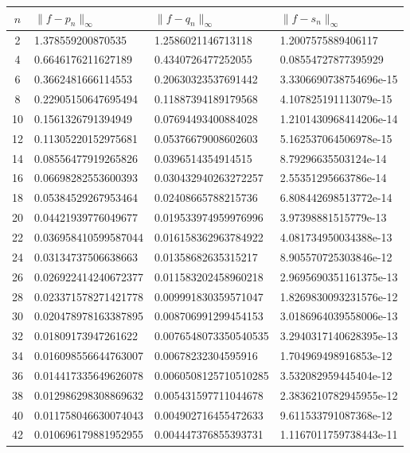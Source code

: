 \documentclass[11pt]{article}
\newenvironment{problem}[2][Question]{\begin{trivlist}
\item[\hskip \labelsep {\bfseries #1}\hskip \labelsep {\bfseries #2.}]}{\end{trivlist}}
\theoremstyle{definition}
\begin{document}
\begin{problem}{Q2}
\begin{enumerate}[(a)]
\newpage
\begin{tabular}{| c | l | l | l | }
\hline
$n$ & $\|f-p_n\|_\infty$ & $\|f-q_n\|_\infty$ & $\|f-s_n\|_\infty$ \\ \hline
2 & 1.378559200870535 & 1.2586021146713118 & 1.2007575889406117 \\ 
4 & 0.6646176211627189 & 0.4340726477252055 & 0.08554727877395929 \\ 
6 & 0.3662481666114553 & 0.20630323537691442 & 3.3306690738754696e-15 \\ 
8 & 0.22905150647695494 & 0.11887394189179568 & 4.107825191113079e-15 \\ 
10 & 0.1561326791394949 & 0.07694493400884028 & 1.2101430968414206e-14 \\ 
12 & 0.11305220152975681 & 0.05376679008602603 & 5.162537064506978e-15 \\ 
14 & 0.08556477919265826 & 0.0396514354914515 & 8.79296635503124e-14 \\ 
16 & 0.06698282553600393 & 0.030432940263272257 & 2.55351295663786e-14 \\ 
18 & 0.05384529267953464 & 0.02408665788215736 & 6.808442698513772e-14 \\ 
20 & 0.04421939776049677 & 0.019533974959976996 & 3.97398881515779e-13 \\ 
22 & 0.036958410599587044 & 0.016158362963784922 & 4.081734950034388e-13 \\ 
24 & 0.03134737506638663 & 0.01358682635315217 & 8.905570725303846e-12 \\ 
26 & 0.026922414240672377 & 0.011583202458960218 & 2.9695690351161375e-13 \\ 
28 & 0.023371578271421778 & 0.009991830359571047 & 1.8269830093231576e-12 \\ 
30 & 0.020478978163387895 & 0.008706991299454153 & 3.0186964039558006e-13 \\ 
32 & 0.01809173947261622 & 0.0076548073350540535 & 3.2940317140628395e-13 \\ 
34 & 0.016098556644763007 & 0.00678232304595916 & 1.704969498916853e-12 \\ 
36 & 0.014417335649626078 & 0.0060508125710510285 & 3.532082959445404e-12 \\ 
38 & 0.012986298308869632 & 0.005431597711044678 & 2.3836210782945955e-12 \\ 
40 & 0.011758046630074043 & 0.004902716455472633 & 9.611533791087368e-12 \\ 
42 & 0.010696179881952955 & 0.004447376855393731 & 1.1167011759738443e-11 \\ 

\end{tabular}
\end{enumerate}
\end{problem}
\end{document}
